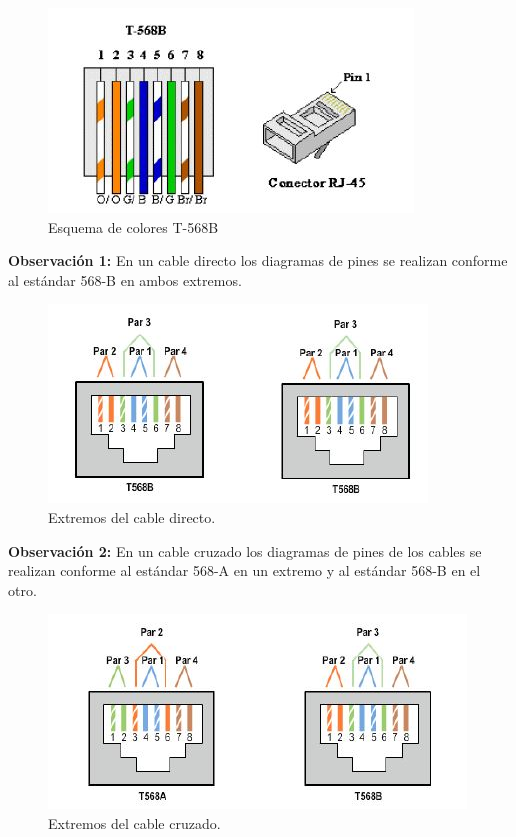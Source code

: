 \documentclass[journal]{IEEEtran}
\begin{document}
\begin{figure}[ht]
	\centering
	\includegraphics[scale=0.75]{5.JPG} 
	\caption{Esquema de colores T-568B}
\end{figure}

\textbf{Observación 1:}
En un cable directo los diagramas de pines se realizan conforme al estándar 568-B en ambos extremos.\\

\begin{figure}[ht]
	\centering
	\includegraphics[scale=0.75]{6.JPG} 
	\caption{Extremos del cable directo.}
\end{figure}

\textbf{Observación 2:}
En un cable cruzado los diagramas de pines de los cables se realizan conforme al estándar 568-A en un extremo y al estándar 568-B en el otro.

\begin{figure}[ht]
	\centering
	\includegraphics[scale=0.75]{7.JPG} 
	\caption{Extremos del cable cruzado.}
\end{figure}
\end{document}
